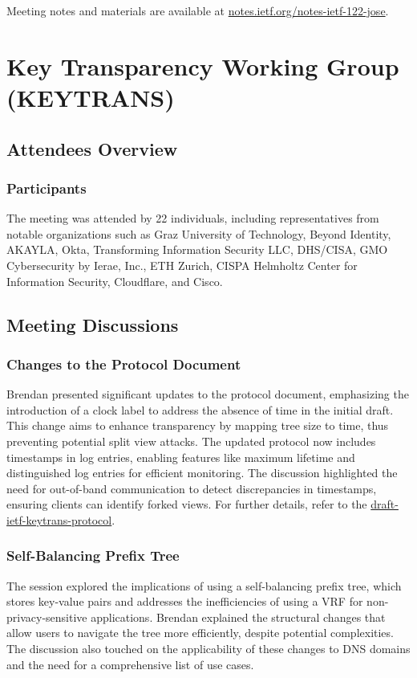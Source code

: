 \documentclass{article}
\begin{document}
Meeting notes and materials are available at \href{https://notes.ietf.org/notes-ietf-122-jose}{notes.ietf.org/notes-ietf-122-jose}.



\newpage

\section{Key Transparency Working Group (KEYTRANS)}

\subsection{Attendees Overview}
\subsubsection{Participants}
The meeting was attended by 22 individuals, including representatives from notable organizations such as Graz University of Technology, Beyond Identity, AKAYLA, Okta, Transforming Information Security LLC, DHS/CISA, GMO Cybersecurity by Ierae, Inc., ETH Zurich, CISPA Helmholtz Center for Information Security, Cloudflare, and Cisco.

\subsection{Meeting Discussions}

\subsubsection{Changes to the Protocol Document}
Brendan presented significant updates to the protocol document, emphasizing the introduction of a clock label to address the absence of time in the initial draft. This change aims to enhance transparency by mapping tree size to time, thus preventing potential split view attacks. The updated protocol now includes timestamps in log entries, enabling features like maximum lifetime and distinguished log entries for efficient monitoring. The discussion highlighted the need for out-of-band communication to detect discrepancies in timestamps, ensuring clients can identify forked views. For further details, refer to the \href{https://datatracker.ietf.org/doc/html/draft-ietf-keytrans-protocol}{draft-ietf-keytrans-protocol}.

\subsubsection{Self-Balancing Prefix Tree}
The session explored the implications of using a self-balancing prefix tree, which stores key-value pairs and addresses the inefficiencies of using a VRF for non-privacy-sensitive applications. Brendan explained the structural changes that allow users to navigate the tree more efficiently, despite potential complexities. The discussion also touched on the applicability of these changes to DNS domains and the need for a comprehensive list of use cases.
\end{document}
